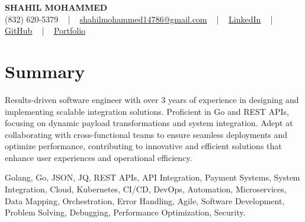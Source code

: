 \documentclass[letterpaper,10pt]{article}
\begin{document}
\begin{center}
    {\fontsize{14pt}{12pt}\selectfont \textbf{\MakeUppercase{Shahil Mohammed}}}\\ \vspace{2pt}
    \fontsize{10pt}{12pt}\selectfont (832) 620-5379 ~ | ~ \href{mailto:shahilmohammed14786@gmail.com}{shahilmohammed14786@gmail.com} ~ | ~  
    \href{https://www.linkedin.com/in/shahil-mohammed-9652931a1/}{\color{blue}\underline{LinkedIn}}  ~ | ~ 
    \href{https://github.com/freakbeast14}{\color{blue}\underline{GitHub}} ~ | ~ 
    \href{https://shahil-mohammed.netlify.app/}{\color{blue}\underline{Portfolio}}
    \vspace{-8pt}
\end{center}

\section{Summary}
\vspace{-2pt}\fontsize{8pt}{9pt}\selectfont
Results-driven software engineer with over 3 years of experience in designing and implementing scalable integration solutions. Proficient in Go and REST APIs, focusing on dynamic payload transformations and system integration. Adept at collaborating with cross-functional teams to ensure seamless deployments and optimize performance, contributing to innovative and efficient solutions that enhance user experiences and operational efficiency.

{\fontsize{1pt}{1pt}\selectfont\color{white}
Golang, Go, JSON, JQ, REST APIs, API Integration, Payment Systems, System Integration, Cloud, Kubernetes, CI/CD, DevOps, Automation, Microservices, Data Mapping, Orchestration, Error Handling, Agile, Software Development, Problem Solving, Debugging, Performance Optimization, Security.
}
\vspace{-8pt}

\vspace{-2pt}
\end{document}
